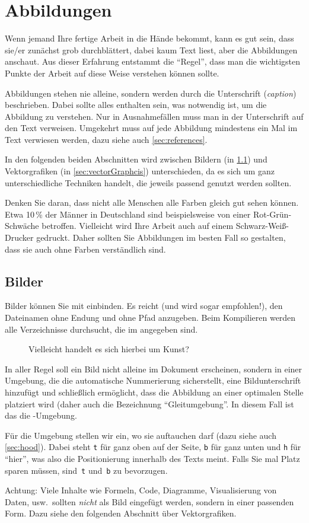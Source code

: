 \section{Abbildungen}
\label{sec:figures}
%
Wenn jemand Ihre fertige Arbeit in die Hände bekommt, kann es gut sein, dass sie/er zunächst grob durchblättert, dabei kaum Text liest, aber die Abbildungen anschaut. Aus dieser Erfahrung entstammt die \enquote{Regel}, dass man die wichtigsten Punkte der Arbeit auf diese Weise verstehen können sollte.
\par
Abbildungen stehen nie alleine, sondern werden durch die Unterschrift (\emph{caption}) beschrieben. Dabei sollte alles enthalten sein, was notwendig ist, um die Abbildung zu verstehen. Nur in Ausnahmefällen muss man in der Unterschrift auf den Text verweisen. Umgekehrt muss auf jede Abbildung mindestens ein Mal im Text verwiesen werden, dazu siehe auch \cref{sec:references}.
\par
In den folgenden beiden Abschnitten wird zwischen Bildern (in \cref{sec:images}) und Vektorgrafiken (in \cref{sec:vectorGraphcis}) unterschieden, da es sich um ganz unterschiedliche Techniken handelt, die jeweils passend genutzt werden sollten.
\par
Denken Sie daran, dass nicht alle Menschen alle Farben gleich gut sehen können. Etwa 10\,\% der Männer in Deutschland sind beispielsweise von einer Rot-Grün-Schwäche betroffen. Vielleicht wird Ihre Arbeit auch auf einem Schwarz-Weiß-Drucker gedruckt. Daher sollten Sie Abbildungen im besten Fall so gestalten, dass sie auch ohne Farben verständlich sind.
%
%
\subsection{Bilder}
\label{sec:images}
%
Bilder können Sie mit  einbinden. Es reicht (und wird sogar empfohlen!), den Dateinamen ohne Endung und ohne Pfad anzugeben. Beim Kompilieren werden alle Verzeichnisse durchsucht, die im  angegeben sind.
%
\begin{figure}[tbh]
 \centering
 \caption{Vielleicht handelt es sich hierbei um Kunst?}
 \label{fig:kunst}
\end{figure}
%
In aller Regel soll ein Bild nicht alleine im Dokument erscheinen, sondern in einer Umgebung, die die automatische Nummerierung sicherstellt, eine Bildunterschrift hinzufügt und schließlich ermöglicht, dass die Abbildung an einer optimalen Stelle platziert wird (daher auch die Bezeichnung \enquote{Gleitumgebung}. In diesem Fall ist das die -Umgebung.
\par
Für die Umgebung stellen wir ein, wo sie auftauchen darf (dazu siehe auch \cref{sec:hood}). Dabei steht \texttt{t} für ganz oben auf der Seite, \texttt{b} für ganz unten und \texttt{h} für \enquote{hier}, was also die Positionierung innerhalb des Texts meint. Falls Sie mal Platz sparen müssen, sind~\texttt{t} und~\texttt{b} zu bevorzugen.
\par
Achtung: Viele Inhalte wie Formeln, Code, Diagramme, Visualisierung von Daten, usw.\ sollten \emph{nicht} als Bild eingefügt werden, sondern in einer passenden Form. Dazu siehe den folgenden Abschnitt über Vektorgrafiken.
%
%
